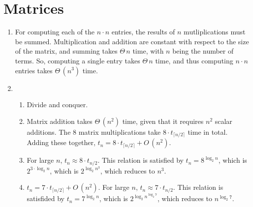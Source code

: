 \documentclass[11pt]{article}
\begin{document}
\section{Matrices}
\begin{enumerate}
\item For computing each of the \(n\cdot n\) entries, the results of \(n\) mutliplications must be summed. Multiplication and addition are constant with respect to the size of the matrix, and summing takes \(\Theta\,n\) time, with \(n\) being the number of terms. So, computing a single entry takes \(\Theta\,n\) time, and thus computing \(n\cdot n\) entries takes \(\Theta\,\left( n^3 \right)\) time.
\item
  \begin{enumerate}
  \item Divide and conquer.
  \item Matrix addition takes \(\Theta\,\left( n^2 \right)\) time, given that it requires \(n^2\) scalar additions. The 8 matrix multiplications take \(8\cdot t_{\lceil n/2 \rceil}\) time in total. Adding these together, \(t_n=8\cdot t_{\lceil n/2 \rceil}+O\,\left( n^2 \right)\).
  \item For large \(n\), \(t_n\approx 8\cdot t_{n/2}\). This relation is satisfied by \(t_n=8^{\log_2 n}\), which is \(2^{3\cdot\log_2 n}\), which is \(2^{\log_2{n^3}}\), which reduces to \(n^3\).
  \item \(t_n=7\cdot t_{\lceil n/2 \rceil}+O\,\left( n^2 \right)\). For large \(n\), \(t_n\approx 7\cdot t_{n/2}\). This relation is satisfided by \(t_n=7^{\log_2 n}\), which is \(2^{\log_2{n^{\log_2 7}}}\), which reduces to \(n^{\log_2 7}\).
  \end{enumerate}
\end{enumerate}
\end{document}
